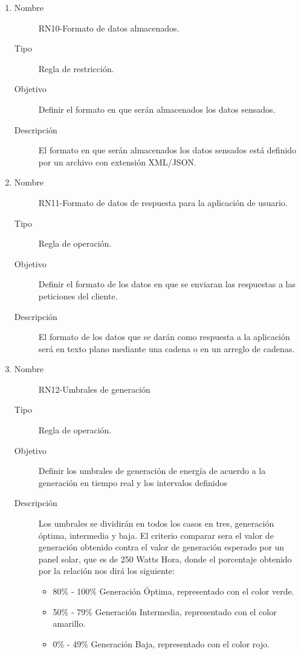 \begin{enumerate}[label=RN\arabic*.]

\item \label{RN10}
		\begin{description}
			\item[Nombre] RN10-Formato de datos almacenados.
			\item[Tipo] Regla de restricción.
			\item[Objetivo] Definir el formato en que serán almacenados los datos sensados.
			\item[Descripción] El formato en que serán almacenados los datos sensados está definido por un archivo con extensión XML/JSON. 
		\end{description}
		
\item \label{RN11}
		\begin{description}
			\item[Nombre] RN11-Formato de datos de respuesta para la aplicación de usuario.
			\item[Tipo] Regla de operación.
			\item[Objetivo] Definir el formato de los datos en que se enviaran las respuestas a las peticiones del cliente.
			\item[Descripción] El formato de los datos que se darán como respuesta a la aplicación será en texto plano mediante una cadena o en un arreglo de cadenas.
		\end{description}
		
\item \label{RN12}
		\begin{description}
			\item[Nombre] RN12-Umbrales de generación
			\item[Tipo] Regla de operación.
			\item[Objetivo] Definir los umbrales de generación de energía de acuerdo a la generación en tiempo real y los intervalos definidos 
			\item[Descripción] Los umbrales se dividirán en todos los casos en tres, generación óptima, intermedia y baja.
			El criterio comparar sera el valor de generación obtenido contra el valor de generación esperado por un panel solar, que es de 250 Watts Hora, donde el porcentaje obtenido por la relación nos dirá los siguiente:
			\begin{itemize}
			    \item 80\% - 100\% Generación Óptima, representado con el color verde.
			    \item 50\% - 79\% Generación Intermedia, representado con el color amarillo.
			    \item 0\% - 49\% Generación Baja, representado con el color rojo.
			\end{itemize}


\end{description}
\end{enumerate}
